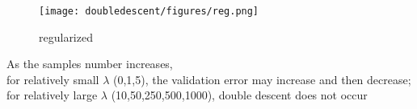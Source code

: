 
\begin{answer}
\begin{figure}[H]
  \centering
  \texttt{[image: doubledescent/figures/reg.png]}
  \caption{regularized}
\end{figure}
As the samples number increases, \\
for relatively small $\lambda $ (0,1,5), the validation error may increase and then
decrease;
for relatively large $\lambda $ (10,50,250,500,1000), double descent does not occur
\end{answer}
